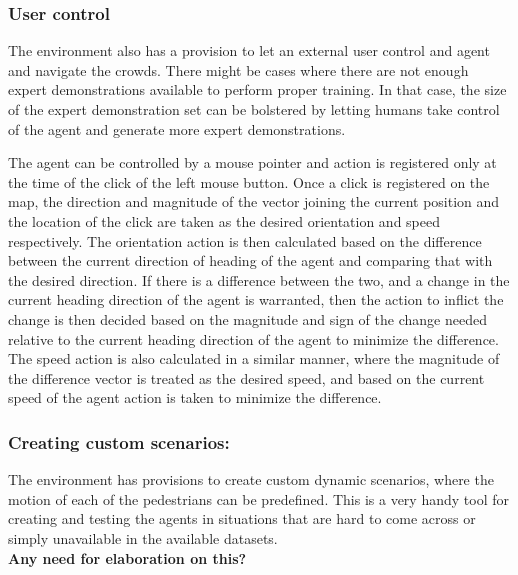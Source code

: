 \subsubsection*{User control}
The environment also has a provision to let an external user control and agent and navigate the crowds. There might be cases where there are not enough expert demonstrations available to perform proper training. In that case, the size of the expert demonstration set can be bolstered by letting humans take control of the agent and generate more expert demonstrations. 

The agent can be controlled by a mouse pointer and action is registered only at the time of the click of the left mouse button. Once a click is registered on the map, the direction and magnitude of the vector joining the current position and the location of the click are taken as the desired orientation and speed respectively.  
The orientation action is then calculated based on the difference between the current direction of heading of the agent and comparing that with the desired direction. If there is a difference between the two, and a change in the current heading direction of the agent is warranted, then the action to inflict the change is then decided based on the magnitude and sign of the change needed relative to the current heading direction of the agent to minimize the difference.
The speed action is also calculated in a similar manner, where the magnitude of the difference vector is treated as the desired speed, and based on the current speed of the agent action is taken to minimize the difference.

\subsubsection*{Creating custom scenarios:}
The environment has provisions to create custom dynamic scenarios, where the motion of each of the pedestrians can be predefined. This is a very handy tool for creating and testing the agents in situations that are hard to come across or simply unavailable in the available datasets.\\
\textbf{Any need for elaboration on this?}


